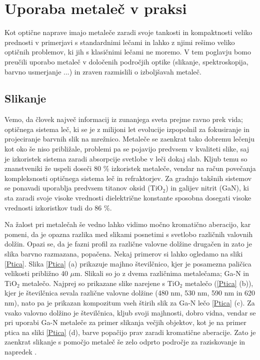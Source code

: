 \documentclass[12pt ]{article}
\begin{document}
 
 \section{Uporaba metaleč v praksi}
 Kot optične naprave imajo metaleče zaradi svoje tankosti in kompaktnosti veliko prednosti v primerjavi s standardnimi lečami in lahko z njimi rešimo veliko optičnih problemov, ki jih s klasičnimi lečami ne moremo. V tem poglavju bomo preučili uporabo metaleč v določenih področjih optike (slikanje, spektroskopija, barvno usmerjanje ...) in zraven razmislili o izboljšavah metaleč. 
 \subsection{Slikanje}
 Vemo, da človek največ informacij iz zunanjega sveta prejme ravno prek vida; optičnega sistema leč, ki se je z milijoni let evolucije izpopolnil za fokusiranje in projeciranje barvnih slik na mrežnico. Metaleče se zaenkrat tako dobremu lečenju kot oko še niso približale, problemi pa se pojavijo predvsem v kvaliteti slike, saj je izkoristek sistema zaradi absorpcije svetlobe v leči dokaj slab. Kljub temu so znanstveniki že uspeli doseči 80 \% izkoristek metaleče, vendar na račun povečanja kompleksnosti optičnega sistema leč in refraktorjev. Za gradnjo takšnih sistemov se ponavadi uporablja predvsem titanov oksid (TiO$_2$) in galijev nitrit (GaN), ki sta zaradi svoje visoke vrednosti dielektrične konstante sposobna dosegati visoke vrednosti izkoristkov tudi do 86 \%.
 
 Na žalost pri metalečah še vedno lahko vidimo močno kromatično aberacijo, kar pomeni, da je opazna razlika med slikami posnetimi s svetlobo različnih valovnih dolžin. Opazi se, da je fazni profil za različne valovne dolžine drugačen in zato je slika barvno razmazana, popačena. Nekaj primerov si lahko ogledamo na sliki \ref{Ptica}. Slika \ref{Ptica} (a) prikazuje majhno številčnico, kjer je posamezna paličica velikosti približno 40 $\mu$m. Slikali so jo z dvema različnima metalečama; Ga-N in TiO$_2$ metalečo. Najprej so prikazane slike narejene s TiO$_2$ metalečo (\ref{Ptica} (b)), kjer je številčnica sevala različne valovne dolžine (480 nm, 530 nm, 590 nm in 620 nm), nato pa je prikazan kompozitum vseh štirih slik za Ga-N lečo \ref{Ptica} (c). Za vsako valovno dolžino je številčnica, kljub svoji majhnosti, dobro vidna, vendar se pri uporabi Ga-N metaleče za primer slikanja večjih objektov, kot je na primer ptica na sliki \ref{Ptica} (d), barve popačijo prav zaradi kromatične aberacije. Zato je zaenkrat slikanje s pomočjo metaleč še zelo odprto področje za raziskovanje in napredek \cite{Metaleče_opis}.
 
\end{document}
